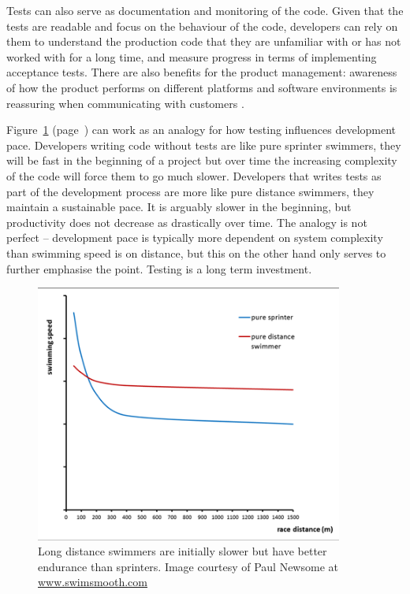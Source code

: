 \documentclass[11pt]{article}
\begin{document}
Tests can also serve as documentation and monitoring of the code. Given that the tests are readable and focus on the behaviour of the code, developers can rely on them to understand the production code that they are unfamiliar with or has not worked with for a long time, and measure progress in terms of implementing acceptance tests. There are also benefits for the product management: awareness of how the product performs on different platforms and software environments is reassuring when communicating with customers \cite[question~38]{Ahnve}.

Figure~\ref{fig:distance} (page~\pageref{fig:distance}) can work as an analogy for how testing influences development pace. Developers writing code without tests are like pure sprinter swimmers, they will be fast in the beginning of a project but over time the increasing complexity of the code will force them to go much slower. Developers that writes tests as part of the development process are more like pure distance swimmers, they maintain a sustainable pace. It is arguably slower in the beginning, but productivity does not decrease as drastically over time. The analogy is not perfect -- development pace is typically more dependent on system complexity than swimming speed is on distance, but this on the other hand only serves to further emphasise the point. Testing is a long term investment.

\begin{figure}[ht]
\centering
\includegraphics[width=0.9\textwidth]{pics/distance.png}
\caption{Long distance swimmers are initially slower but have better endurance than sprinters. Image courtesy of Paul Newsome at \small \url{www.swimsmooth.com}}
\label{fig:distance}
\end{figure}
\end{document}
